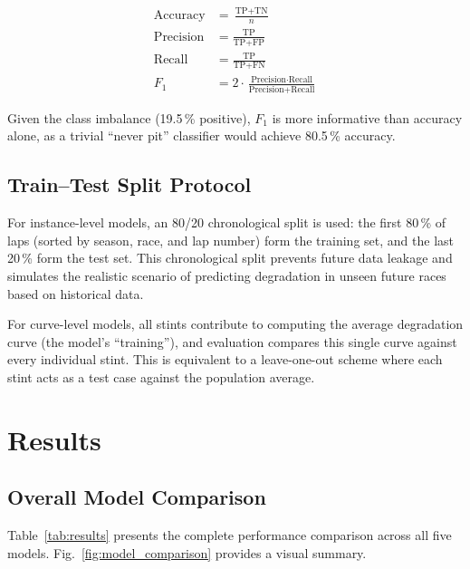 \documentclass[journal,twoside]{IEEEtran}
\begin{document}
\begin{align}
  \text{Accuracy} &= \frac{\text{TP} + \text{TN}}{n}
  \label{eq:accuracy} \\[4pt]
  \text{Precision} &= \frac{\text{TP}}{\text{TP} + \text{FP}}
  \label{eq:precision} \\[4pt]
  \text{Recall} &= \frac{\text{TP}}{\text{TP} + \text{FN}}
  \label{eq:recall} \\[4pt]
  F_{1} &= 2 \cdot \frac{\text{Precision} \cdot \text{Recall}}
  {\text{Precision} + \text{Recall}}
  \label{eq:f1}
\end{align}

Given the class imbalance (19.5\,\% positive), $F_{1}$ is more
informative than accuracy alone, as a trivial ``never pit'' classifier
would achieve 80.5\,\% accuracy.

\subsection{Train--Test Split Protocol}

For instance-level models, an 80/20 chronological split is used:
the first 80\,\% of laps (sorted by season, race, and lap number)
form the training set, and the last 20\,\% form the test set.  This
chronological split prevents future data leakage and simulates the
realistic scenario of predicting degradation in unseen future races
based on historical data.

For curve-level models, all stints contribute to computing the average
degradation curve (the model's ``training''), and evaluation compares
this single curve against every individual stint.  This is equivalent
to a leave-one-out scheme where each stint acts as a test case against
the population average.

\section{Results}\label{sec:results}

\subsection{Overall Model Comparison}

Table~\ref{tab:results} presents the complete performance comparison
across all five models.  Fig.~\ref{fig:model_comparison} provides a
visual summary.
\end{document}
